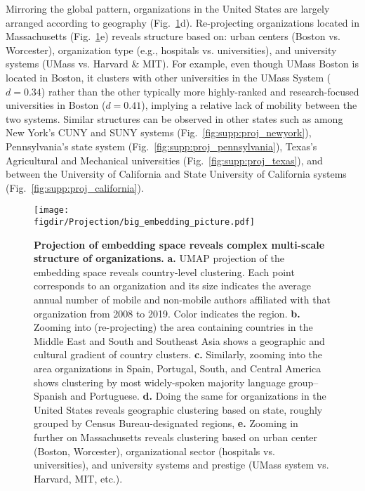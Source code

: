 \documentclass[12pt]{article} %
\def\figdir{../Figs}
\begin{document}
Mirroring the global pattern, organizations in the United States are largely arranged according to geography (Fig.~\ref{fig:projection}d).
Re-projecting organizations located in Massachusetts (Fig.~\ref{fig:projection}e) reveals structure based on: urban centers (Boston vs. Worcester), organization type (e.g., hospitals vs. universities), and university systems (UMass vs. Harvard \& MIT).
For example, even though UMass Boston is located in Boston, it clusters with  other universities in the UMass System ($d = 0.34$) rather than the other typically more highly-ranked and research-focused universities in Boston ($d = 0.41$), implying a relative lack of mobility between the two systems.
Similar structures can be observed in other states such as among New York's CUNY and SUNY systems (Fig.~\ref{fig:supp:proj_newyork}), Pennsylvania's state system (Fig.~\ref{fig:supp:proj_pennsylvania}), Texas's Agricultural and Mechanical universities (Fig.~\ref{fig:supp:proj_texas}), and between the University of California and State University of California systems (Fig.~\ref{fig:supp:proj_california}).

\begin{figure}[hp!]
	\centering
	\texttt{[image: \\figdir/Projection/big\_embedding\_picture.pdf]}
	\caption{
		\textbf{Projection of embedding space reveals complex multi-scale structure of organizations.}
		\textbf{a.}
		UMAP projection \autocite{mcinnes2018umap} of the embedding space reveals country-level clustering.
		Each point corresponds to an organization and its size indicates the average annual number of mobile and non-mobile authors affiliated with that organization from 2008 to 2019.
		Color indicates the region.
		\textbf{b.} Zooming into (re-projecting) the area containing countries in the Middle East and South and Southeast Asia shows a geographic and cultural gradient of country clusters.
		\textbf{c.} Similarly, zooming into the area organizations in Spain, Portugal, South, and Central America shows clustering by most widely-spoken majority language group--Spanish and Portuguese.
		\textbf{d.} Doing the same for organizations in the United States reveals geographic clustering based on state, roughly grouped by Census Bureau-designated regions,
		\textbf{e.} Zooming in further on Massachusetts reveals clustering based on urban center (Boston, Worcester), organizational sector (hospitals vs. universities), and university systems and prestige (UMass system vs. Harvard, MIT, etc.).
	}
	\label{fig:projection}
\end{figure}
\end{document}
